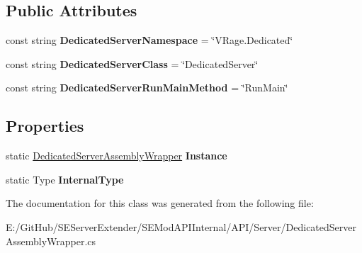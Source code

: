 \subsection*{Public Attributes}
\begin{DoxyCompactItemize}
\item 
\hypertarget{class_s_e_mod_a_p_i_internal_1_1_a_p_i_1_1_server_1_1_dedicated_server_assembly_wrapper_ad07ce37b1096d7b76cb31f3ea49b1643}{}const string {\bfseries Dedicated\+Server\+Namespace} = \char`\"{}V\+Rage.\+Dedicated\char`\"{}\label{class_s_e_mod_a_p_i_internal_1_1_a_p_i_1_1_server_1_1_dedicated_server_assembly_wrapper_ad07ce37b1096d7b76cb31f3ea49b1643}

\item 
\hypertarget{class_s_e_mod_a_p_i_internal_1_1_a_p_i_1_1_server_1_1_dedicated_server_assembly_wrapper_a25f60409ed64e57911181e09cc1bbe9a}{}const string {\bfseries Dedicated\+Server\+Class} = \char`\"{}Dedicated\+Server\char`\"{}\label{class_s_e_mod_a_p_i_internal_1_1_a_p_i_1_1_server_1_1_dedicated_server_assembly_wrapper_a25f60409ed64e57911181e09cc1bbe9a}

\item 
\hypertarget{class_s_e_mod_a_p_i_internal_1_1_a_p_i_1_1_server_1_1_dedicated_server_assembly_wrapper_a5fd50251a1326582eda79741f3f5a02f}{}const string {\bfseries Dedicated\+Server\+Run\+Main\+Method} = \char`\"{}Run\+Main\char`\"{}\label{class_s_e_mod_a_p_i_internal_1_1_a_p_i_1_1_server_1_1_dedicated_server_assembly_wrapper_a5fd50251a1326582eda79741f3f5a02f}

\end{DoxyCompactItemize}
\subsection*{Properties}
\begin{DoxyCompactItemize}
\item 
\hypertarget{class_s_e_mod_a_p_i_internal_1_1_a_p_i_1_1_server_1_1_dedicated_server_assembly_wrapper_ad1ac99266914ee565abe5b5519f55335}{}static \hyperlink{class_s_e_mod_a_p_i_internal_1_1_a_p_i_1_1_server_1_1_dedicated_server_assembly_wrapper}{Dedicated\+Server\+Assembly\+Wrapper} {\bfseries Instance}\label{class_s_e_mod_a_p_i_internal_1_1_a_p_i_1_1_server_1_1_dedicated_server_assembly_wrapper_ad1ac99266914ee565abe5b5519f55335}

\item 
\hypertarget{class_s_e_mod_a_p_i_internal_1_1_a_p_i_1_1_server_1_1_dedicated_server_assembly_wrapper_a88110af722db5076921d629cbf6753b7}{}static Type {\bfseries Internal\+Type}\label{class_s_e_mod_a_p_i_internal_1_1_a_p_i_1_1_server_1_1_dedicated_server_assembly_wrapper_a88110af722db5076921d629cbf6753b7}

\end{DoxyCompactItemize}


The documentation for this class was generated from the following file\+:\begin{DoxyCompactItemize}
\item 
E\+:/\+Git\+Hub/\+S\+E\+Server\+Extender/\+S\+E\+Mod\+A\+P\+I\+Internal/\+A\+P\+I/\+Server/Dedicated\+Server\+Assembly\+Wrapper.\+cs\end{DoxyCompactItemize}
